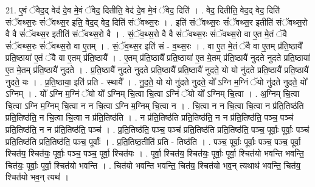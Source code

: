 \documentclass[17pt]{extarticle}
\begin{document}
21. ए॒वं ॅवेद॒द् वेद॑ दे॒व मे॒वं ॅवेद॒ दितीति॒ वेद॑ दे॒व मे॒वं ॅवेद॒ दिति॑ । . वेद॒ दितीति॒ वेद॒द् वेद॒ दिति॑ संॅवथ्स॒रः सं॑ॅवथ्स॒र इति॒ वेद॒द् वेद॒ दिति॑ संॅवथ्स॒रः । . इति॑ संॅवथ्स॒रः सं॑ॅवथ्स॒र इतीति॑ संॅवथ्स॒रो वै वै सं॑ॅवथ्स॒र इतीति॑ संॅवथ्स॒रो वै । . सं॒ॅव॒थ्स॒रो वै वै सं॑ॅवथ्स॒रः सं॑ॅवथ्स॒रो वा ए॒त मे॒तं ॅवै सं॑ॅवथ्स॒रः सं॑ॅवथ्स॒रो वा ए॒तम् । . सं॒ॅव॒थ्स॒र इति॑ सं - व॒थ्स॒रः । . वा ए॒त मे॒तं ॅवै वा ए॒तम् प्र॑ति॒ष्ठायै᳚ प्रति॒ष्ठाया॑ ए॒तं ॅवै वा ए॒तम् प्र॑ति॒ष्ठायै᳚ । . ए॒तम् प्र॑ति॒ष्ठायै᳚ प्रति॒ष्ठाया॑ ए॒त मे॒तम् प्र॑ति॒ष्ठायै॑ नुदते नुदते प्रति॒ष्ठाया॑ ए॒त मे॒तम् प्र॑ति॒ष्ठायै॑ नुदते । . प्र॒ति॒ष्ठायै॑ नुदते नुदते प्रति॒ष्ठायै᳚ प्रति॒ष्ठायै॑ नुदते॒ यो यो नु॑दते प्रति॒ष्ठायै᳚ प्रति॒ष्ठायै॑ नुदते॒ यः । . प्र॒ति॒ष्ठाया॒ इति॑ प्रति - स्थायै᳚ । . नु॒द॒ते॒ यो यो नु॑दते नुदते॒ यो᳚ ऽग्नि म॒ग्निं ॅयो नु॑दते नुदते॒ यो᳚ ऽग्निम् । . यो᳚ ऽग्नि म॒ग्निं ॅयो यो᳚ ऽग्निम् चि॒त्वा चि॒त्वा ऽग्निं ॅयो यो᳚ ऽग्निम् चि॒त्वा । . अ॒ग्निम् चि॒त्वा चि॒त्वा ऽग्नि म॒ग्निम् चि॒त्वा न न चि॒त्वा ऽग्नि म॒ग्निम् चि॒त्वा न । . चि॒त्वा न न चि॒त्वा चि॒त्वा न प्र॑ति॒तिष्ठ॑ति प्रति॒तिष्ठ॑ति॒ न चि॒त्वा चि॒त्वा न प्र॑ति॒तिष्ठ॑ति । . न प्र॑ति॒तिष्ठ॑ति प्रति॒तिष्ठ॑ति॒ न न प्र॑ति॒तिष्ठ॑ति॒ पञ्च॒ पञ्च॑ प्रति॒तिष्ठ॑ति॒ न न प्र॑ति॒तिष्ठ॑ति॒ पञ्च॑ । . प्र॒ति॒तिष्ठ॑ति॒ पञ्च॒ पञ्च॑ प्रति॒तिष्ठ॑ति प्रति॒तिष्ठ॑ति॒ पञ्च॒ पूर्वाः॒ पूर्वाः॒ पञ्च॑ प्रति॒तिष्ठ॑ति प्रति॒तिष्ठ॑ति॒ पञ्च॒ पूर्वाः᳚ । . प्र॒ति॒तिष्ठ॒तीति॑ प्रति - तिष्ठ॑ति । . पञ्च॒ पूर्वाः॒ पूर्वाः॒ पञ्च॒ पञ्च॒ पूर्वा॒ श्चित॑य॒ श्चित॑यः॒ पूर्वाः॒ पञ्च॒ पञ्च॒ पूर्वा॒ श्चित॑यः । . पूर्वा॒ श्चित॑य॒ श्चित॑यः॒ पूर्वाः॒ पूर्वा॒ श्चित॑यो भवन्ति भवन्ति॒ चित॑यः॒ पूर्वाः॒ पूर्वा॒ श्चित॑यो भवन्ति । . चित॑यो भवन्ति भवन्ति॒ चित॑य॒ श्चित॑यो भव॒न् त्यथाथ॑ भवन्ति॒ चित॑य॒ श्चित॑यो भव॒न् त्यथ॑ । \newline
\end{document}
